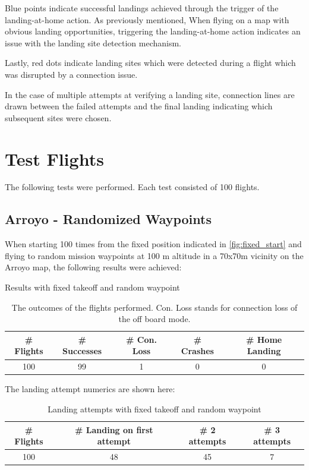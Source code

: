 Blue points indicate successful landings achieved through the trigger of the landing-at-home action. As previously mentioned, When flying on a map with obvious landing opportunities, triggering the landing-at-home action indicates an issue with the landing site detection mechanism.

Lastly, red dots indicate landing sites which were detected during a flight which was disrupted by a connection issue.

In the case of multiple attempts at verifying a landing site, connection lines are drawn between the failed attempts and the final landing indicating which subsequent sites were chosen.


\section{Test Flights}\label{sec:test_flights}

The following tests were performed. Each test consisted of 100 flights.

\subsection{Arroyo - Randomized Waypoints}\label{subsec:eval_rand_wp}

When starting 100 times from the fixed position indicated in \cref{fig:fixed_start} and flying to random mission waypoints at 100 m altitude in a 70x70m vicinity on the Arroyo map, the following results were achieved:

\begin{table}[h]
    \begin{center}
     \caption{Results with fixed takeoff and random waypoint}\vspace{1ex}
     \label{tab:result_random_waypoint}
     \begin{tabular}{|c|c|c|c|c|}
     \hline
     \# Flights & \# Successes & \# Con. Loss & \# Crashes & \# Home Landing\\ \hline \hline
     100 & 99 & 1 & 0 & 0 \\
     \hline
     \end{tabular}
     \caption{The outcomes of the flights performed. Con. Loss stands for connection loss of the off board mode.}
    \end{center}
    \end{table}

    The landing attempt numerics are shown here:
    \begin{table}[h]
        \begin{center}
         \caption{Landing attempts with fixed takeoff and random waypoint}\vspace{1ex}
         \label{tab:land_nums_random_waypoint}
         \begin{tabular}{|c|c|c|c|}
         \hline
         \# Flights & \# Landing on first attempt & \# 2 attempts & \# 3 attempts\\ \hline \hline
         100 & 48 & 45 & 7 \\
         \hline
         \end{tabular}
        \end{center}
    \end{table}

